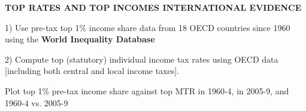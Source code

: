 \documentclass[landscape]{slides}
\begin{document}
%
%
%
%
%
%
%
%

\begin{slide}
\begin{center}
{\bf TOP RATES AND TOP INCOMES INTERNATIONAL EVIDENCE}
\end{center}

1) Use pre-tax top 1\% income share data from 18 OECD countries since 1960 using
the {\bf World Inequality Database}

2) Compute top (statutory) individual income tax rates using OECD data [including both
central and local income taxes].


Plot top 1\% pre-tax income share against top MTR in 1960-4,  in 2005-9, and 1960-4 vs. 2005-9

\end{slide}

\begin{slide}

\end{slide}

\begin{slide}

\end{slide}
\end{document}
